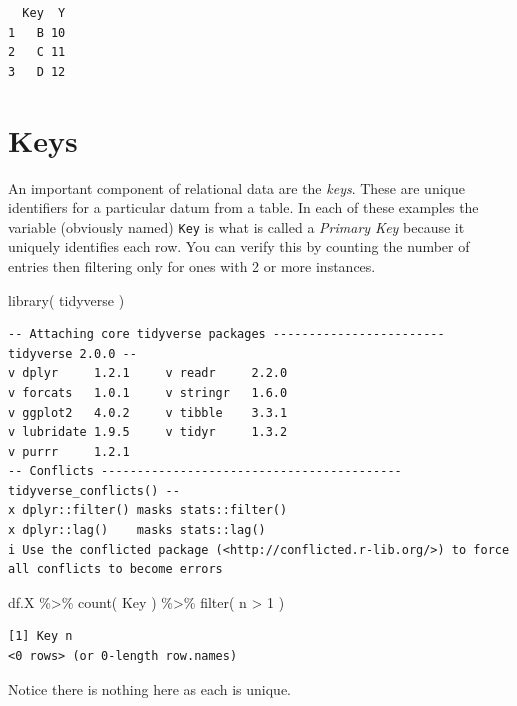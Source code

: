 \documentclass[
  letterpaper,
]{book}
\newenvironment{Shaded}{\begin{snugshade}}{\end{snugshade}}
\newcommand{\DecValTok}[1]{\textcolor[rgb]{0.68,0.00,0.00}{#1}}
\newcommand{\FunctionTok}[1]{\textcolor[rgb]{0.28,0.35,0.67}{#1}}
\newcommand{\NormalTok}[1]{\textcolor[rgb]{0.00,0.23,0.31}{#1}}
\newcommand{\SpecialCharTok}[1]{\textcolor[rgb]{0.37,0.37,0.37}{#1}}
\begin{document}
\begin{verbatim}
  Key  Y
1   B 10
2   C 11
3   D 12
\end{verbatim}

\section{Keys}\label{keys}

An important component of relational data are the \emph{keys}. These are
unique identifiers for a particular datum from a table. In each of these
examples the variable (obviously named) \texttt{Key} is what is called a
\emph{Primary Key} because it uniquely identifies each row. You can
verify this by counting the number of entries then filtering only for
ones with 2 or more instances.

\begin{Shaded}
\begin{Highlighting}[]
\FunctionTok{library}\NormalTok{( tidyverse )}
\end{Highlighting}
\end{Shaded}

\begin{verbatim}
-- Attaching core tidyverse packages ------------------------ tidyverse 2.0.0 --
v dplyr     1.2.1     v readr     2.2.0
v forcats   1.0.1     v stringr   1.6.0
v ggplot2   4.0.2     v tibble    3.3.1
v lubridate 1.9.5     v tidyr     1.3.2
v purrr     1.2.1     
-- Conflicts ------------------------------------------ tidyverse_conflicts() --
x dplyr::filter() masks stats::filter()
x dplyr::lag()    masks stats::lag()
i Use the conflicted package (<http://conflicted.r-lib.org/>) to force all conflicts to become errors
\end{verbatim}

\begin{Shaded}
\begin{Highlighting}[]
\NormalTok{df.X }\SpecialCharTok{\%\textgreater{}\%}
  \FunctionTok{count}\NormalTok{( Key ) }\SpecialCharTok{\%\textgreater{}\%}
  \FunctionTok{filter}\NormalTok{( n }\SpecialCharTok{\textgreater{}} \DecValTok{1}\NormalTok{ )}
\end{Highlighting}
\end{Shaded}

\begin{verbatim}
[1] Key n  
<0 rows> (or 0-length row.names)
\end{verbatim}

Notice there is nothing here as each is unique.
\end{document}
